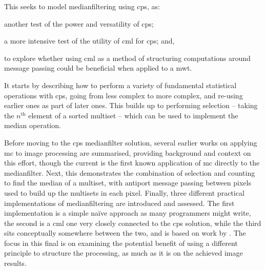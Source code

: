This  seeks to model \gls{medianfilter}ing using \gls{cps}, as:
\begin{inparaenum}[a)]
\item  another test of the power and versatility of \gls{cps};
\item a more intensive test of the utility of \gls{cml} for \gls{cps}; and,
\item to explore whether using \gls{cml} as a method of structuring computations around message passing could be beneficial when applied to a \gls{mwt}.
\end{inparaenum}
It starts by describing how to perform a variety of fundamental statistical operations with \gls{cps}, going from less complex to more complex, and re-using earlier ones as part of later ones.  This builds up to performing selection -- taking the \(n^{\text{th}}\) element of a sorted multiset -- which can be used to implement the median operation.

Before moving to the \gls{cps} \gls{medianfilter} solution, several earlier works on applying \gls{mc} to image processing are summarised, providing background and context on this effort, though the current  is the first known application of \gls{mc} directly to the \gls{medianfilter}.  Next, this  demonstrates the combination of selection and counting to find the median of a multiset, with antiport message passing between pixels used to build up the multisets in each pixel.  Finally, three different practical implementations of \gls{medianfilter}ing are introduced and assessed.  The first implementation is a simple naïve approach as many programmers might write, the second is a \gls{cml} one very closely connected to the \gls{cps} solution, while the third sits conceptually somewhere between the two, and is based on work by \citeauthor{Braunl2001} \cite{Braunl2001}.  The focus in this final  is on examining the potential benefit of using a different principle to structure the processing, as much as it is on the achieved image results.